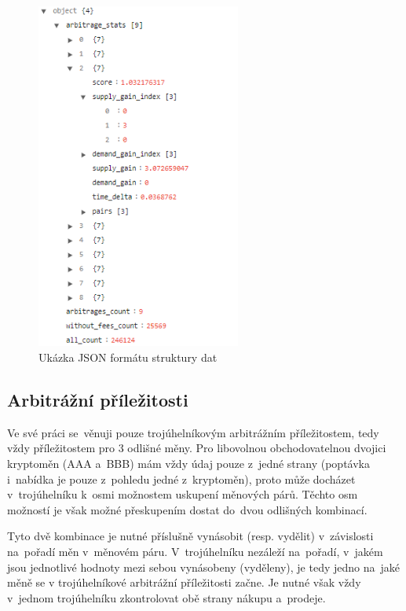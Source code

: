 \documentclass[thesis=B,czech]{FITthesis}[2019/03/21]
\begin{document}
\begin{figure}\centering
	\includegraphics[width=0.6\textwidth]{images/json_data.PNG}
	\caption{Ukázka JSON formátu struktury dat}\label{json_data}
\end{figure}
\subsection{Arbitrážní příležitosti}
Ve své práci se~věnuji pouze trojúhelníkovým arbitrážním příležitostem, tedy vždy příležitostem pro 3 odlišné měny. Pro libovolnou obchodovatelnou dvojici kryptoměn (AAA a~BBB) mám vždy údaj pouze z~jedné strany (poptávka i~nabídka je pouze z~pohledu jedné z~kryptoměn), proto může docházet v~trojúhelníku k~osmi možnostem uskupení měnových párů. Těchto osm \linebreak možností je však možné přeskupením dostat do~dvou odlišných kombinací.

Tyto dvě kombinace je nutné příslušně vynásobit (resp. vydělit) v~závislosti na~pořadí měn v~měnovém páru. V~trojúhelníku nezáleží na~pořadí, v~jakém jsou jednotlivé hodnoty mezi sebou vynásobeny (vyděleny), je tedy jedno na~jaké měně se v trojúhelníkové arbitrážní příležitosti začne. Je nutné však vždy v~jednom trojúhelníku zkontrolovat obě strany nákupu a~prodeje.
\end{document}
